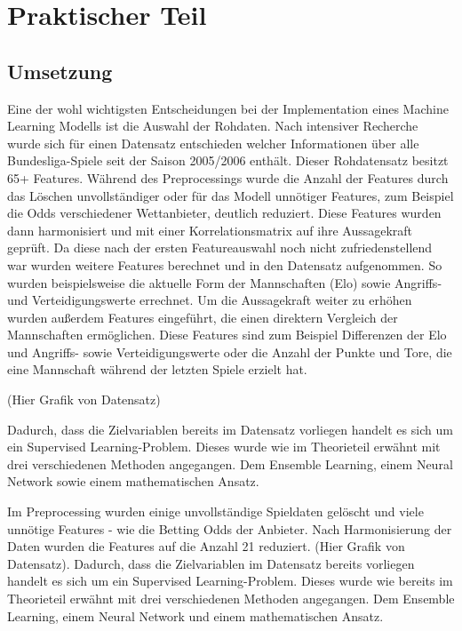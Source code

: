 \chapter{Praktischer Teil}

\section{Umsetzung}

Eine der wohl wichtigsten Entscheidungen bei der Implementation
eines Machine Learning Modells ist die Auswahl der Rohdaten.
Nach intensiver Recherche wurde sich für einen Datensatz
entschieden welcher Informationen über alle Bundesliga-Spiele
seit der Saison 2005/2006 enthält. Dieser Rohdatensatz besitzt
65+ Features. Während des Preprocessings wurde die Anzahl der Features durch
das Löschen unvollständiger oder für das Modell unnötiger Features, zum Beispiel die
Odds verschiedener Wettanbieter, deutlich reduziert. Diese Features wurden dann
harmonisiert und mit einer Korrelationsmatrix auf ihre Aussagekraft geprüft.
Da diese nach der ersten Featureauswahl noch nicht zufriedenstellend war
wurden weitere Features berechnet und in den Datensatz aufgenommen. So wurden
beispielsweise die aktuelle Form der Mannschaften (Elo) sowie Angriffs- und
Verteidigungswerte errechnet. Um die Aussagekraft weiter zu erhöhen wurden außerdem
Features eingeführt, die einen direktern Vergleich der Mannschaften ermöglichen.
Diese Features sind zum Beispiel Differenzen der Elo und Angriffs- sowie Verteidigungswerte
oder die Anzahl der Punkte und Tore, die eine Mannschaft während der letzten Spiele erzielt hat.

(Hier Grafik von Datensatz)

Dadurch, dass die Zielvariablen bereits im Datensatz  vorliegen
handelt es sich um ein Supervised Learning-Problem. Dieses wurde
wie im Theorieteil erwähnt mit drei verschiedenen Methoden angegangen.
Dem Ensemble Learning, einem Neural Network sowie einem mathematischen Ansatz.


Im Preprocessing wurden einige unvollständige
Spieldaten gelöscht und viele unnötige Features - wie die Betting
Odds der Anbieter. Nach Harmonisierung der Daten wurden die
Features auf die Anzahl 21 reduziert.  (Hier Grafik von Datensatz).
 Dadurch, dass die Zielvariablen im Datensatz bereits vorliegen
 handelt es sich um ein Supervised Learning-Problem. Dieses wurde
 wie bereits im Theorieteil erwähnt mit drei verschiedenen
 Methoden angegangen. Dem Ensemble Learning, einem Neural Network
 und einem mathematischen Ansatz.

